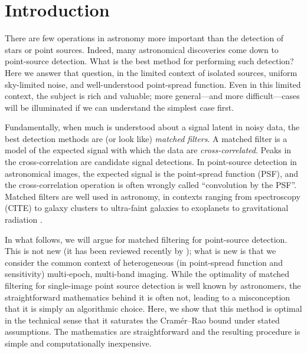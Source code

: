 \documentclass[letterpaper,preprint]{aastex62}
\begin{document}


\section{Introduction}

There are few operations in astronomy more important than the
detection of stars or point sources.
Indeed, many astronomical discoveries come down to point-source
detection.
What is the best method for performing such detection?
Here we answer that question, in the limited context of isolated
sources, uniform sky-limited noise, and well-understood point-spread
function.
Even in this limited context, the subject is rich and valuable; more
general---and more difficult---cases will be illuminated if we can
understand the simplest case first.

Fundamentally, when much is understood about a signal latent in noisy
data, the best detection methods are (or look like) \emph{matched
filters}.
A matched filter is a model of the expected signal with which the data
are \emph{cross-correlated}. %
Peaks in the cross-correlation are candidate signal detections.
In point-source detection in astronomical images, the expected signal is the
point-spread function (PSF), and the cross-correlation operation is often
wrongly called ``convolution by the PSF''.
Matched filters are well used in astronomy, in contexts ranging from
spectroscopy (CITE) to
galaxy clusters \cite{redmapper, melin} to
ultra-faint galaxies \cite{willman1} to
exoplanets \cite{exoplanet} to
gravitational radiation \cite{ligo}.


In what follows, we will argue for matched filtering for point-source
detection.  This is not new (it has been reviewed recently by
\cite{zackay1}); what is new is that we consider the common context of
heterogeneous (in point-spread function and sensitivity) multi-epoch,
multi-band imaging.
%
While the optimality of matched filtering for single-image point
source detection is well known by astronomers, the straightforward
mathematics behind it is often not, leading to a misconception that it
is simply an algorithmic choice.  Here, we show that this method is
optimal in the technical sense that it saturates the Cram\'er--Rao
bound under stated assumptions.  The mathematics are straightforward
and the resulting procedure is simple and computationally inexpensive.
\end{document}
